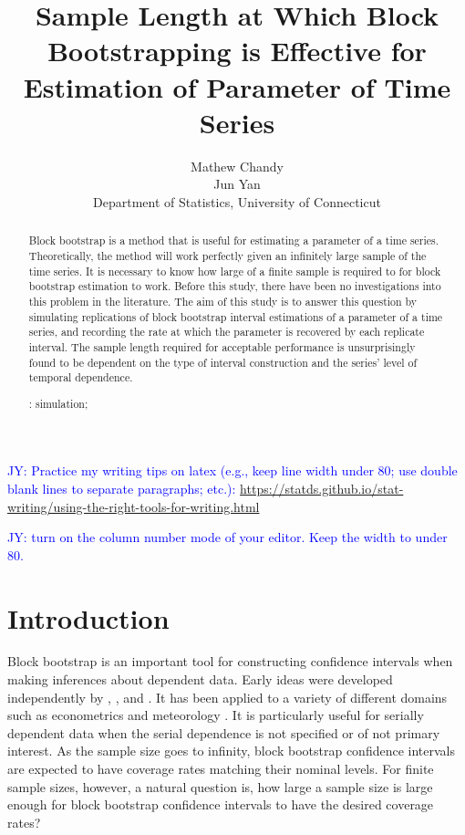 \documentclass[12pt, letterpaper, titlepage]{article}
\title{Sample Length at Which Block Bootstrapping is Effective for Estimation of Parameter of Time Series}
\author{Mathew Chandy\\
  Jun Yan\\[1ex]
  Department of Statistics, University of Connecticut\\
}
\date{}
\newcommand{\jy}[1]{\textcolor{blue}{JY: #1}}
\begin{document}
 
\maketitle

\doublespace

\begin{abstract}
Block bootstrap is a method that is useful for estimating a parameter of a time
series. Theoretically, the method will work perfectly given an infinitely large sample of the time series.
It is necessary to know how large of a finite sample is required to for block bootstrap estimation to work. 
Before this study, there have been no investigations into this problem in the literature. The aim of this study 
is to answer this question by simulating replications of block bootstrap interval estimations of a parameter of a time series, 
and recording the rate at which the parameter is recovered by each replicate interval. 
The sample length required for acceptable performance is unsurprisingly found to be dependent 
on the type of interval construction and the series' level of temporal dependence.


\bigskip
\noindent{}:
simulation;
\end{abstract}


\jy{Practice my writing tips on latex (e.g., keep line width under 80; use
  double blank lines to separate paragraphs; etc.):
  \url{https://statds.github.io/stat-writing/using-the-right-tools-for-writing.html}}

\jy{turn on the column number mode of your editor. Keep the width to under 80.}

\section{Introduction}
\label{sec:intro}

Block bootstrap is an important tool for constructing confidence intervals when
making inferences about dependent data. Early ideas were developed independently
by \citet{hall1985resampling}, \citet{carlstein1986use}, and 
\citet{kunsch1989jackknife}. %
It has been applied to a variety of different domains such 
as econometrics \citep{mackinnon2006bootstrap} and meteorology
\citep{varga2017generalised}. It is particularly useful for serially dependent
data when the serial dependence is not specified or of not primary interest.
As the sample size goes to infinity, block bootstrap confidence intervals are
expected to have coverage rates matching their nominal levels. For finite sample
sizes, however, a natural question is, how large a sample size is large enough
for block bootstrap confidence intervals to have the desired coverage rates?
\end{document}
